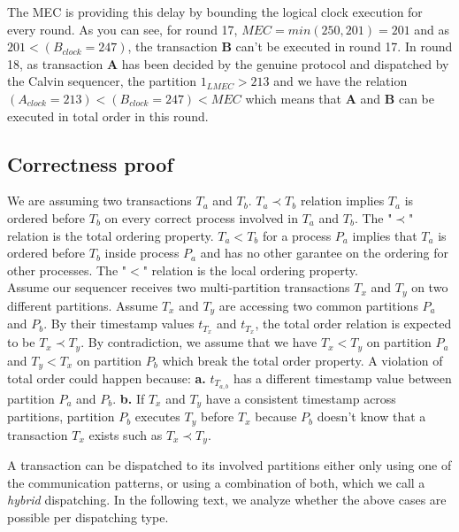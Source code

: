 \documentclass[a4paper, 10pt]{article}
\newcommand{\Li}[1]{\mynote{Li}{#1}{blue}}
\begin{document}
    The MEC is providing this delay by bounding the logical clock execution for every round. As you can see,
    for round 17, $MEC=min(250, 201)=201$ and as $201 < (B_{clock} = 247)$,
    the transaction \textbf{B} can't be executed in round 17. In round 18, as transaction \textbf{A} has been decided
    by the genuine protocol and dispatched by the Calvin sequencer,
    the partition $1_{LMEC} > 213$ and we have the relation $(A_{clock} = 213) < (B_{clock} = 247) < MEC$
    which means that \textbf{A} and \textbf{B} can be executed in total order in this round.

\subsection{Correctness proof}
We are assuming two transactions $T_a$ and $T_b$. $T_a \prec T_b$ relation implies $T_a$ is ordered before
$T_b$ on every correct process involved in $T_a$ and $T_b$. The "$\prec$" relation is the total ordering property.
$T_a < T_b$ for a process $P_a$ implies that $T_a$ is ordered before $T_b$ inside process $P_a$ and
has no other garantee on the ordering for other processes. The "$<$" relation is the local ordering property. \\

Assume our sequencer receives two multi-partition transactions $T_x$ and $T_y$ on two different partitions.
Assume $T_x$ and $T_y$ are accessing two common partitions $P_a$ and $P_b$. By their timestamp
values $t_{T_{x}}$ and $t_{T_x}$, the total order relation is expected to be $T_x \prec T_y$.
By contradiction, we assume that we have $T_x < T_y$ on partition $P_a$ and $T_y < T_x$ on partition
$P_b$ which break the total order property. A violation of total order could happen because:
\textbf{a.} $t_{T_{a,b}}$ has a different timestamp value between partition $P_a$ and $P_b$. \textbf{b.}
If $T_x$ and $T_y$ have a consistent timestamp across partitions, partition $P_b$ executes $T_y$
before $T_x$ because $P_b$ doesn't know that a transaction $T_x$ exists such as $T_x \prec T_y$.


A transaction can be dispatched to its involved partitions either only using
one of the communication patterns, or using a combination of both, which we
call a \textit{hybrid} dispatching. In the following text, we analyze whether
the above cases are possible per dispatching type.
\end{document}
